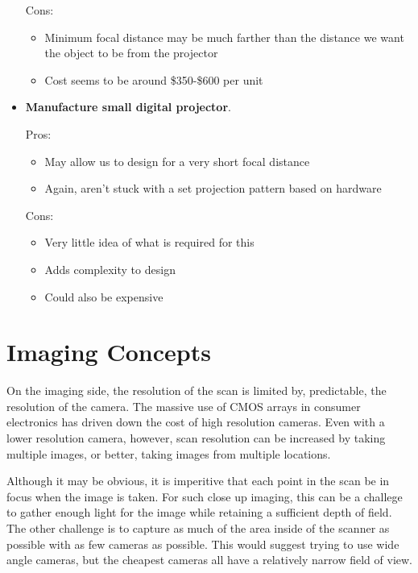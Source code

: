 \documentclass[10pt]{article}
\begin{document}
\begin{itemize}
Cons:
\begin{itemize}
\item Minimum focal distance may be much farther than the distance we want the
  object to be from the projector
\item Cost seems to be around \$350-\$600 per unit
\end{itemize}

\item \textbf{Manufacture small digital projector}.

Pros:
\begin{itemize}
\item May allow us to design for a very short focal distance
\item Again, aren't stuck with a set projection pattern based on hardware
\end{itemize}

Cons:
\begin{itemize}
\item Very little idea of what is required for this
\item Adds complexity to design
\item Could also be expensive
\end{itemize}
\end{itemize}

\section{Imaging Concepts}
On the imaging side, the resolution of the scan is limited by, predictable, the resolution of the camera. The massive use of CMOS arrays in consumer electronics has driven down the cost of high resolution cameras.  Even with a lower resolution camera, however, scan resolution can be increased by taking multiple images, or better, taking images from multiple locations.

Although it may be obvious, it is imperitive that each point in the scan be in focus when the image is taken. For such close up imaging, this can be a challege to gather enough light for the image while retaining a sufficient depth of field. The other challenge is to capture as much of the area inside of the scanner as possible with as few cameras as possible. This would suggest trying to use wide angle cameras, but the cheapest cameras all have a relatively narrow field of view.
\end{document}

